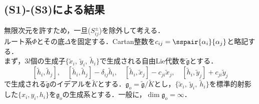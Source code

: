 \documentclass[rep_main]{subfiles}
\begin{document}
\subsection{(S1)-(S3)による結果}
無限次元を許すため，一旦($S_{ij}^\pm$)を除外して考える．\\
ルート系$\Phi$とその底$\Delta$を固定する．Cartan整数を$c_{ij} = \sspair{\alpha_i}{\alpha_j}$と略記する．\\
まず，$3l$個の生成子$\{\tilde{x}_i,\ \tilde{y}_i,\ \tilde{h}_i\}$で生成される自由Lie代数を$\tilde{\mathfrak{g}}$とする．
\begin{equation}
	\label{eq:semi-simple-ideal}
	[\tilde{h}_i, \tilde{h}_j],\quad  [\tilde{h}_i, \tilde{h}_j] - \delta_{ij}\tilde{h}_i,\quad  [\tilde{h}_i, \tilde{x}_j] - c_{ji}\tilde{x}_j,\quad  [\tilde{h}_i, \tilde{y}_j] + c_{ji}\tilde{y}_j
\end{equation}
で生成される$\tilde{\mathfrak{g}}$のイデアルを$\tilde{K}$とする．$\mathfrak{g}_o = \tilde{\mathfrak{g}} / \tilde{K}$とし，$\{\tilde{x}_i,\ \tilde{y}_i,\ \tilde{h}_i\}$を標準的射影した$\{x_i, y_i, h_i\}$を$\mathfrak{g}_o$の生成系とする．一般に，$\dim \mathfrak{g}_o = \infty$．
\end{document}
